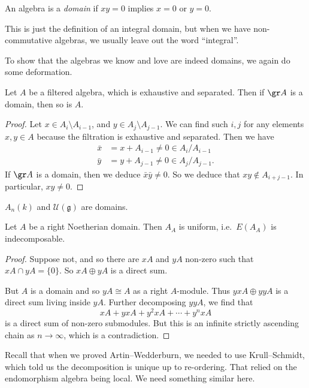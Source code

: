\documentclass[a4paper]{article}
\begin{document}
\begin{defi}[Domain]
  An algebra is a \emph{domain} if $xy = 0$ implies $x = 0$ or $y = 0$.
\end{defi}
This is just the definition of an integral domain, but when we have non-commutative algebras, we usually leave out the word ``integral''.

To show that the algebras we know and love are indeed domains, we again do some deformation.
\begin{lemma}
  Let $A$ be a filtered algebra, which is exhaustive and separated. Then if $\gr A$ is a domain, then so is $A$.
\end{lemma}

\begin{proof}
  Let $x \in A_i \setminus A_{i - 1}$, and $y \in A_j \setminus A_{j - 1}$. We can find such $i, j$ for any elements $x, y \in A$ because the filtration is exhaustive and separated. Then we have
  \begin{align*}
    \bar{x} &= x + A_{i - 1} \not= 0 \in A_i/A_{i - 1}\\
    \bar{y} &= y + A_{j - 1} \not= 0 \in A_j/A_{j - 1}.
  \end{align*}
  If $\gr A$ is a domain, then we deduce $\bar{x}\bar{y} \not= 0$. So we deduce that $xy \not \in A_{i + j - 1}$. In particular, $xy \not = 0$.
\end{proof}

\begin{cor}
  $A_n(k)$ and $\mathcal{U}(\mathfrak{g})$ are domains.
\end{cor}

\begin{lemma}
  Let $A$ be a right Noetherian domain. Then $A_A$ is uniform, i.e.\ $E(A_A)$ is indecomposable.
\end{lemma}

\begin{proof}
  Suppose not, and so there are $xA$ and $yA$ non-zero such that $xA \cap yA = \{0\}$. So $xA \oplus yA$ is a direct sum.

  But $A$ is a domain and so $yA \cong A$ as a right $A$-module. Thus $yxA \oplus yyA$ is a direct sum living inside $yA$. Further decomposing $yyA$, we find that
  \[
    xA + yx A + y^2 xA + \cdots + y^n xA
  \]
  is a direct sum of non-zero submodules. But this is an infinite strictly ascending chain as $n \to \infty$, which is a contradiction.
\end{proof}

Recall that when we proved Artin--Wedderburn, we needed to use Krull--Schmidt, which told us the decomposition is unique up to re-ordering. That relied on the endomorphism algebra being local. We need something similar here.
\end{document}
